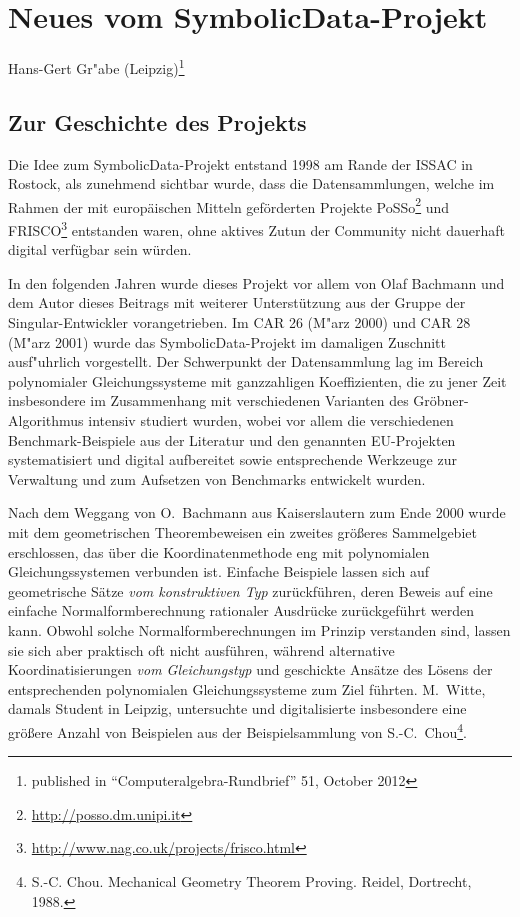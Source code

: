 \documentclass{article}
\newcommand{\SD}{{\sc Symbolic\-Data}}
\begin{document}
\section*{\centering Neues vom \SD-Projekt}

\begin{center} 
Hans-Gert Gr"abe (Leipzig)\footnote{published in ``Computeralgebra-Rundbrief''
  51, October 2012}
\end{center}

\subsection*{Zur Geschichte des Projekts}

Die Idee zum \SD-Projekt entstand 1998 am Rande der ISSAC in Rostock, als
zunehmend sichtbar wurde, dass die Datensammlungen, welche im Rahmen der mit
europäischen Mitteln geförderten Projekte
PoSSo\footnote{\url{http://posso.dm.unipi.it}} und
FRISCO\footnote{\url{http://www.nag.co.uk/projects/frisco.html}} entstanden
waren, ohne aktives Zutun der Community nicht dauerhaft digital verfügbar sein
würden.

In den folgenden Jahren wurde dieses Projekt vor allem von Olaf Bachmann und
dem Autor dieses Beitrags mit weiterer Unterstützung aus der Gruppe der
Singular-Entwickler vorangetrieben. Im CAR 26 (M"arz 2000) und CAR 28 (M"arz
2001) wurde das \SD-Projekt im damaligen Zuschnitt ausf"uhrlich vorgestellt.
Der Schwerpunkt der Datensammlung lag im Bereich polynomialer
Gleichungssysteme mit ganzzahligen Koeffizienten, die zu jener Zeit
insbesondere im Zusammenhang mit verschiedenen Varianten des
Gröbner-Algorithmus intensiv studiert wurden, wobei vor allem die
verschiedenen Benchmark-Beispiele aus der Literatur und den genannten
EU-Projekten systematisiert und digital aufbereitet sowie entsprechende
Werkzeuge zur Verwaltung und zum Aufsetzen von Benchmarks entwickelt wurden.
 
Nach dem Weggang von O.~Bachmann aus Kaiserslautern zum Ende 2000 wurde mit
dem geometrischen Theorembeweisen ein zweites größeres Sammelgebiet
erschlossen, das über die Koordinatenmethode eng mit polynomialen
Gleichungssystemen verbunden ist. Einfache Beispiele lassen sich auf
geometrische Sätze \emph{vom konstruktiven Typ} zurückführen, deren Beweis auf
eine {\glqq}einfache{\grqq} Normalformberechnung rationaler Ausdrücke
zurückgeführt werden kann. Obwohl solche Normalformberechnungen im Prinzip
verstanden sind, lassen sie sich aber praktisch oft nicht ausführen, während
alternative Koordinatisierungen \emph{vom Gleichungstyp} und geschickte
Ansätze des Lösens der entsprechenden polynomialen Gleichungssysteme zum Ziel
führten. M.~Witte, damals Student in Leipzig, untersuchte und digitalisierte
insbesondere eine größere Anzahl von Beispielen aus der Beispielsammlung von
S.-C.~Chou\footnote{S.-C. Chou. Mechanical Geometry Theorem Proving. Reidel,
  Dortrecht, 1988.}. 
\end{document}

